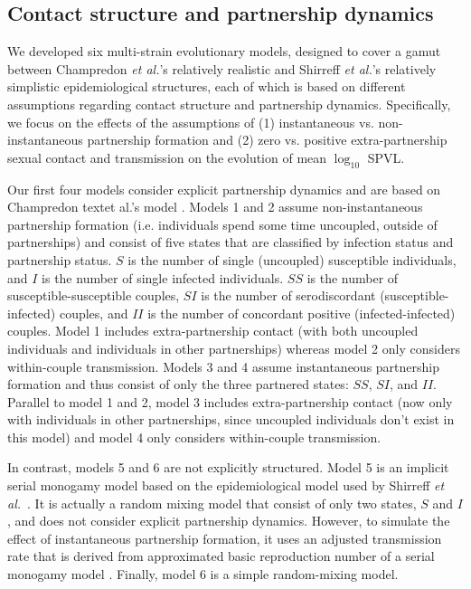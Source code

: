 \documentclass[10pt,letterpaper]{article}
\newcommand{\Lspvl}{$\log_{10}$ SPVL}
\newcommand{\etal}{\textit{et al.}}
\begin{document}
\subsection*{Contact structure and partnership dynamics}

We developed six multi-strain evolutionary models, designed to cover a gamut between Champredon \etal's relatively realistic \cite{champredon_hiv_2013} and Shirreff \etal's relatively simplistic \cite{shirreff_transmission_2011} epidemiological structures, each of which is based on different assumptions regarding contact structure and partnership dynamics. Specifically, we focus on the effects of the assumptions of (1) instantaneous vs. non-instantaneous partnership formation and (2) zero vs. positive extra-partnership sexual contact and transmission on the evolution of mean \Lspvl.

Our first four models consider explicit partnership dynamics and are based on Champredon text{et al.}'s model \cite{champredon_hiv_2013}. Models 1 and 2 assume non-instantaneous partnership formation (i.e. individuals spend some time uncoupled, outside of partnerships) and consist of five states that are classified by infection status and partnership status. $S$ is the number of single (uncoupled) susceptible individuals, and $I$ is the number of single infected individuals. $SS$ is the number of susceptible-susceptible couples, $SI$ is the number of serodiscordant (susceptible-infected) couples, and $II$ is the number of concordant positive (infected-infected) couples. Model 1 includes extra-partnership contact (with both uncoupled individuals and individuals in other partnerships) whereas model 2 only considers within-couple transmission. Models 3 and 4 assume instantaneous partnership formation and thus consist of only the three partnered states: $SS$, $SI$, and $II$. Parallel to model 1 and 2, model 3 includes extra-partnership contact (now only with individuals in other partnerships, since uncoupled individuals don't exist in this model) and model 4 only considers within-couple transmission.

In contrast, models 5 and 6 are not explicitly structured.  Model 5 is an implicit serial monogamy model based on the epidemiological model used by Shirreff \etal\ \cite{shirreff_transmission_2011}. It is actually a random mixing model that consist of only two states, $S$ and $I$, and does not consider explicit partnership dynamics. However, to simulate the effect of instantaneous partnership formation, it uses an adjusted transmission rate that is derived from approximated basic reproduction number of a serial monogamy model \cite{hollingsworth_hiv1_2008}. Finally, model 6 is a simple random-mixing model.
\end{document}
